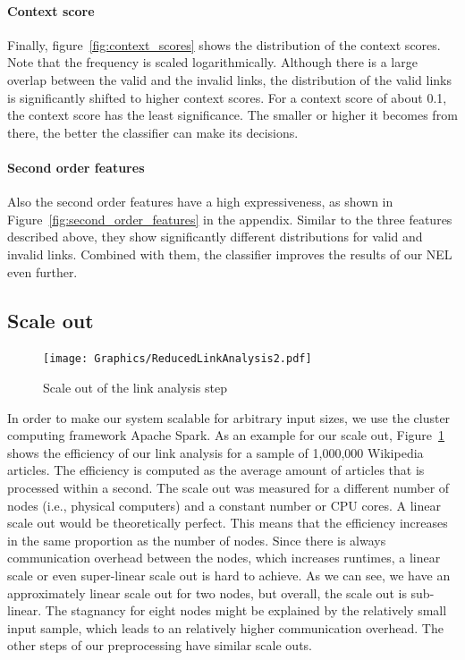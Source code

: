 \paragraph{Context score}
Finally, figure~\ref{fig:context_scores} shows the distribution of the context scores. Note that the frequency is scaled logarithmically. Although there is a large overlap between the valid and the invalid links, the distribution of the valid links is significantly shifted to higher context scores. For a context score of about 0.1, the context score has the least significance. The smaller or higher it becomes from there, the better the classifier can make its decisions.

\paragraph{Second order features}
Also the second order features have a high expressiveness, as shown in Figure~\ref{fig:second_order_features} in the appendix. Similar to the three features described above, they show significantly different distributions for valid and invalid links. Combined with them, the classifier improves the results of our NEL even further.


\subsection{Scale out}
\begin{figure}[ht]
	\centering
  \texttt{[image: Graphics/ReducedLinkAnalysis2.pdf]}
	\caption{Scale out of the link analysis step}
	\label{fig:scale_out}
\end{figure}

In order to make our system scalable for arbitrary input sizes, we use the cluster computing framework Apache Spark\footnotemark{}. As an example for our scale out, Figure~\ref{fig:scale_out} shows the efficiency of our link analysis for a sample of 1,000,000 Wikipedia articles. The efficiency is computed as the average amount of articles that is processed within a second. The scale out was measured for a different number of nodes (i.e., physical computers) and a constant number or CPU cores. A linear scale out would be theoretically perfect. This means that the efficiency increases in the same proportion as the number of nodes. Since there is always communication overhead between the nodes, which increases runtimes, a linear scale or even super-linear scale out is hard to achieve. As we can see, we have an approximately linear scale out for two nodes, but overall, the scale out is sub-linear. The stagnancy for eight nodes might be explained by the relatively small input sample, which leads to an relatively higher communication overhead. The other steps of our preprocessing have similar scale outs.

